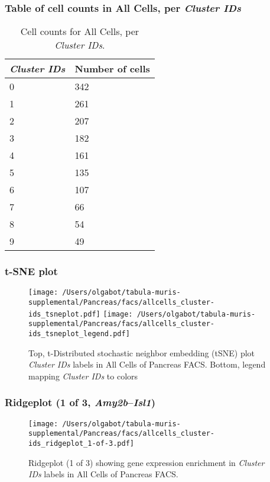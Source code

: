 \subsubsection{Table of cell counts in All Cells, per \emph{Cluster IDs}}\begin{table}[h]
\centering
\label{my-label}
\begin{tabular}{@{}ll@{}}
\toprule

\emph{Cluster IDs}& Number of cells \\ \midrule
0 & 342 \\

1 & 261 \\

2 & 207 \\

3 & 182 \\

4 & 161 \\

5 & 135 \\

6 & 107 \\

7 & 66 \\

8 & 54 \\

9 & 49 \\
\bottomrule
\end{tabular}
\caption{Cell counts for All Cells, per \emph{Cluster IDs}.}
\end{table}

\clearpage
\subsubsection{t-SNE plot}
\begin{figure}[h]
\centering
\texttt{[image: /Users/olgabot/tabula-muris-supplemental/Pancreas/facs/allcells\_cluster-ids\_tsneplot.pdf]}
\texttt{[image: /Users/olgabot/tabula-muris-supplemental/Pancreas/facs/allcells\_cluster-ids\_tsneplot\_legend.pdf]}
\caption{Top, t-Distributed stochastic neighbor embedding (tSNE) plot  \emph{Cluster IDs} labels in All Cells of Pancreas FACS. Bottom, legend mapping \emph{Cluster IDs} to colors}
\end{figure}


\clearpage

\subsubsection{Ridgeplot (1 of 3, \emph{Amy2b}--\emph{Isl1})}
\begin{figure}[h]
\centering
\texttt{[image: /Users/olgabot/tabula-muris-supplemental/Pancreas/facs/allcells\_cluster-ids\_ridgeplot\_1-of-3.pdf]}

\caption{ Ridgeplot (1 of 3)  showing gene expression enrichment in \emph{Cluster IDs} labels in All Cells of Pancreas FACS. }
\end{figure}


